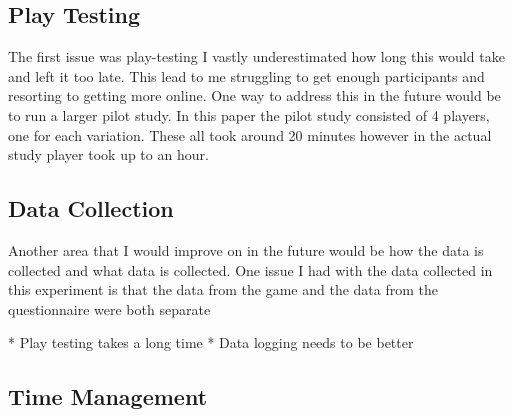 \documentclass[journal]{IEEEtran}
\begin{document}
	\subsection{Play Testing}
	The first issue was play-testing I vastly underestimated how long this would take and left it too late. This lead to me struggling to get enough participants and resorting to getting more online. One way to address this in the future would be to run a larger pilot study. In this paper the pilot study consisted of 4 players, one for each variation. These all took around 20 minutes however in the actual study player took up to an hour. 
	
	\subsection{Data Collection}
	Another area that I would improve on in the future would be how the data is collected and what data is collected. One issue I had with the data collected in this experiment is that the data from the game and the data from the questionnaire were both separate 
	
	    * Play testing takes a long time
	    * Data logging needs to be better 
	
	\subsection{Time Management}
	
	
\end{document}

